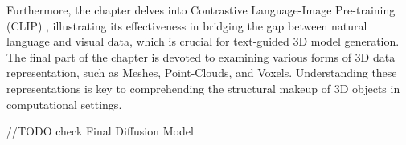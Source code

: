 Furthermore, the chapter delves into Contrastive Language-Image Pre-training (CLIP) \citep{radfordCLIP}, illustrating its effectiveness in bridging the gap between natural language and visual data, which is crucial for text-guided 3D model generation. The final part of the chapter is devoted to examining various forms of 3D data representation, such as Meshes, Point-Clouds, and Voxels. Understanding these representations is key to comprehending the structural makeup of 3D objects in computational settings.

//TODO check Final Diffusion Model






